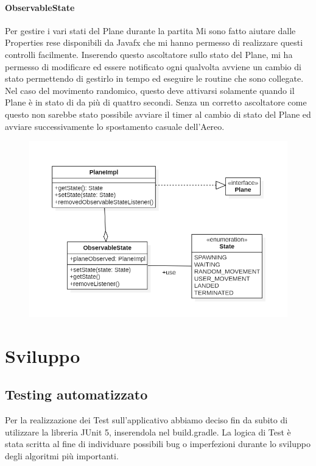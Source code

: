 \documentclass[a4paper,12pt]{report}
\begin{document}
\subsubsection{ObservableState}
Per gestire i vari stati del Plane durante la partita
Mi sono fatto aiutare dalle Properties rese disponibili da Javafx che mi hanno permesso di realizzare questi controlli facilmente.
Inserendo questo ascoltatore sullo stato del Plane, mi ha permesso di modificare ed essere notificato ogni qualvolta avviene un cambio di 
stato permettendo di gestirlo in tempo ed eseguire le routine che sono collegate.
Nel caso del movimento randomico, questo deve attivarsi solamente quando il Plane è in stato di  da più di quattro secondi.
Senza un corretto ascoltatore come questo non sarebbe stato possibile avviare il timer al cambio di stato del Plane ed avviare successivamente 
lo spostamento casuale dell’Aereo.
\begin{figure}[H]
    \begin{center}
        \centering
        \includegraphics[width=\textwidth]{img/Design/Rodilosso/ObservableState.png}
    \end{center}
    \label{img:observable}
\end{figure}

\chapter{Sviluppo}

\section{Testing automatizzato}
Per la realizzazione dei Test sull’applicativo abbiamo deciso fin da subito di utilizzare la libreria JUnit 5, inserendola nel build.gradle.
La logica di Test è stata scritta al fine di individuare possibili bug o imperfezioni durante lo sviluppo degli algoritmi più importanti.
\end{document}
